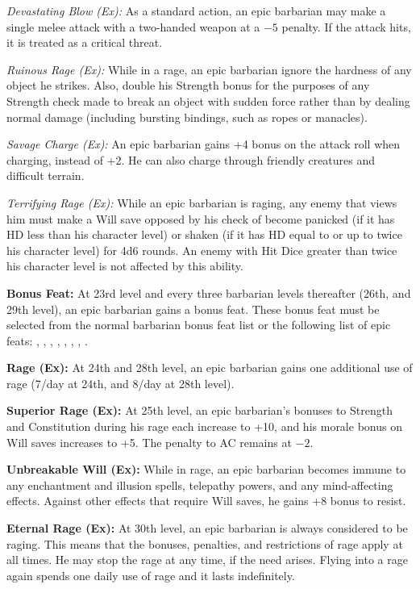 \textit{Devastating Blow (Ex):} As a standard action, an epic barbarian may make a single melee attack with a two-handed weapon at a $-5$ penalty. If the attack hits, it is treated as a critical threat.

\textit{Ruinous Rage (Ex):} While in a rage, an epic barbarian ignore the hardness of any object he strikes. Also, double his Strength bonus for the purposes of any Strength check made to break an object with sudden force rather than by dealing normal damage (including bursting bindings, such as ropes or manacles).

\textit{Savage Charge (Ex):} An epic barbarian gains +4 bonus on the attack roll when charging, instead of +2. He can also charge through friendly creatures and difficult terrain.

\textit{Terrifying Rage (Ex):} While an epic barbarian is raging, any enemy that views him must make a Will save opposed by his  check of become panicked (if it has HD less than his character level) or shaken (if it has HD equal to or up to twice his character level) for 4d6 rounds. An enemy with Hit Dice greater than twice his character level is not affected by this ability.


\textbf{Bonus Feat:} At 23rd level and every three barbarian levels thereafter (26th, and 29th level), an epic barbarian gains a bonus feat. These bonus feat must be selected from the normal barbarian bonus feat list or the following list of epic feats:
,
,
,
,
,
,
,
.

\textbf{Rage (Ex):} At 24th and 28th level, an epic barbarian gains one additional use of rage (7/day at 24th, and 8/day at 28th level).

\textbf{Superior Rage (Ex):} At 25th level, an epic barbarian's bonuses to Strength and Constitution during his rage each increase to +10, and his morale bonus on Will saves increases to +5. The penalty to AC remains at $-2$.

\textbf{Unbreakable Will (Ex):} While in rage, an epic barbarian becomes immune to any enchantment and illusion spells, telepathy powers, and any mind-affecting effects. Against other effects that require Will saves, he gains +8 bonus to resist.

\textbf{Eternal Rage (Ex):} At 30th level, an epic barbarian is always considered to be raging. This means that the bonuses, penalties, and restrictions of rage apply at all times. He may stop the rage at any time, if the need arises. Flying into a rage again spends one daily use of rage and it lasts indefinitely.
